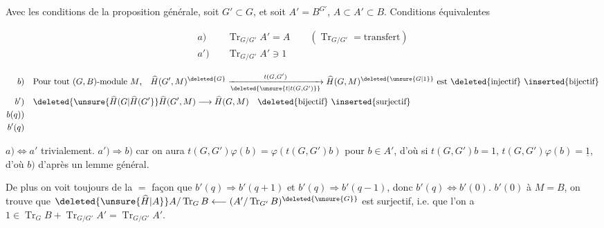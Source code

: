 
Avec les conditions de la proposition générale, soit $G'\subset G$, et soit $A'=B^{G'}$, $A\subset A'\subset B$. Conditions équivalentes

\[\begin{aligned}
a)\quad &\operatorname{Tr}_{G/G'} A'=A \qquad(\operatorname{Tr}_{G/G'}=\text{transfert})\\
a')\quad &\operatorname{Tr}_{G/G'} A'\ni1
\end{aligned}\]

\[\begin{aligned}
b)\quad &\text{Pour tout $(G,B)$-module $M$,}\quad \widehat H(G',M)^{\deleted{G}}\xrightarrow[\deleted{\unsure{t|t(G,G')}}]{t(G,G')}\widehat H(G,M)^{\deleted{\unsure{G|1}}}\ \text{est \deleted{injectif} \inserted{bijectif}}\\
b')\quad &\deleted{\unsure{\widehat H(G|\widehat H(G'}}\widehat H(G',M)\longrightarrow\widehat H(G,M)\quad\text{\deleted{bijectif} \inserted{surjectif}}\\
b(q))\quad &\\ b'(q)\quad &
\end{aligned}\]

$a)\Leftrightarrow a'$ trivialement. $a')\Rightarrow b)$ car on aura $t(G,G')\varphi(b)=\varphi(t(G,G')b)$ pour $b\in A'$, d'où si $t(G,G')b=1$, $t(G,G')\varphi(b)=\underline{1}$, d'où $b)$ d'après un lemme général.



De plus on voit toujours de la $=$ façon que $b'(q)\Rightarrow b'(q+1)$ et $b'(q)\Rightarrow b'(q-1)$, donc $b'(q)\Leftrightarrow b'(0)$.  $b'(0)$ à $M=B$, on trouve que $\deleted{\unsure{\widehat H|A}} A/\operatorname{Tr}_G B\longleftarrow(A'/\operatorname{Tr}_{G'} B)^{\deleted{\unsure{G}}}$ est surjectif, i.e. que l'on a $1\in\operatorname{Tr}_G B+\operatorname{Tr}_{G/G'}A'=\operatorname{Tr}_{G/G'} A'$.

